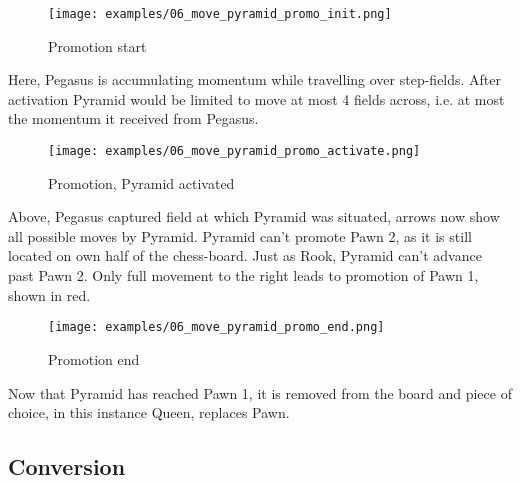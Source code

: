 \clearpage %

\noindent
\begin{figure}[!h]
\texttt{[image: examples/06\_move\_pyramid\_promo\_init.png]}
\caption{Promotion start}
\label{fig:06_move_pyramid_promo_init}
\end{figure}

Here, Pegasus is accumulating momentum while travelling over step-fields. After
activation Pyramid would be limited to move at most 4 fields across, i.e. at most
the momentum it received from Pegasus.

\clearpage %

\noindent
\begin{figure}[!h]
\texttt{[image: examples/06\_move\_pyramid\_promo\_activate.png]}
\caption{Promotion, Pyramid activated}
\label{fig:06_move_pyramid_promo_activate}
\end{figure}

Above, Pegasus captured field at which Pyramid was situated, arrows now show
all possible moves by Pyramid. Pyramid can't promote Pawn 2, as it is still
located on own half of the chess-board. Just as Rook, Pyramid can't advance
past Pawn 2. Only full movement to the right leads to promotion of Pawn 1,
shown in red.

\clearpage %

\noindent
\begin{figure}[!h]
\texttt{[image: examples/06\_move\_pyramid\_promo\_end.png]}
\caption{Promotion end}
\label{fig:06_move_pyramid_promo_end}
\end{figure}

Now that Pyramid has reached Pawn 1, it is removed from the board and piece of
choice, in this instance Queen, replaces Pawn.

\clearpage %

\subsection*{Conversion}

